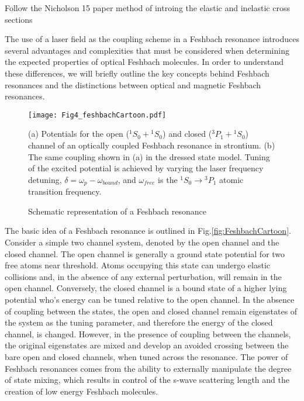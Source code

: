 Follow the Nicholson 15 paper method of introing the elastic and inelastic cross sections

The use of a laser field as the coupling scheme in a Feshbach resonance introduces several advantages and complexities that must be considered when determining the expected properties of optical Feshbach molecules. In order to understand these differences, we will briefly outline the key concepts behind Feshbach resonances and the distinctions between optical and magnetic Feshbach resonances.


\begin{figure} \label{fig:ch3_FeshbachCartoon}
	\centerline{
	\texttt{[image: Fig4\_feshbachCartoon.pdf]}}
	\caption{Schematic representation of a Feshbach resonance}{(a) Potentials for the open ($^1S_0\!+\!^1S_0$) and closed ($^3P_1\!+\!^1S_0$) channel of an optically coupled Feshbach resonance in strontium. (b) The same coupling shown in (a) in the dressed state model. Tuning of the excited potential is achieved by varying the laser frequency detuning, $\delta = \omega_p - \omega_{bound}$, and $\omega_{free}$ is the $^1S_0\!\rightarrow\!^3P_1$ atomic transition frequency.}
\end{figure} 
	

The basic idea of a Feshbach resonance is outlined in Fig.\;\ref{fig:FeshbachCartoon}. Consider a simple two channel system, denoted by the open channel and the closed channel. The open channel is generally a ground state potential for two free atoms near threshold. Atoms occupying this state can undergo elastic collisions and, in the absence of any external perturbation, will remain in the open channel. Conversely, the closed channel is a bound state of a higher lying potential who's energy can be tuned relative to the open channel. In the absence of coupling between the states, the open and closed channel remain eigenstates of the system as the tuning parameter, and therefore the energy of the closed channel, is changed. However, in the presence of coupling between the channels, the original eigenstates are mixed and develop an avoided crossing between the bare open and closed channels, when tuned across the resonance. The power of Feshbach resonances comes from the ability to externally manipulate the degree of state mixing, which results in control of the s-wave scattering length and the creation of low energy Feshbach molecules.


